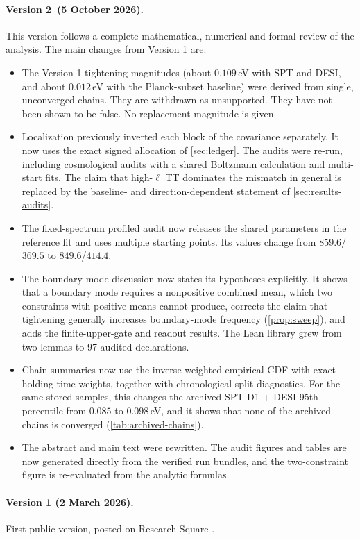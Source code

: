 \documentclass[11pt]{article}
\theoremstyle{remark}
\newcommand{\manuscriptversion}{Version 2}
\newcommand{\manuscriptdate}{5 October 2026}
\numberwithin{equation}{section}
\begin{document}
\paragraph{\manuscriptversion\ (\manuscriptdate).}
This version follows a complete mathematical, numerical and formal review of the analysis. The main changes from Version 1 are:
\begin{itemize}[leftmargin=*, itemsep=1pt]
  \item The Version 1 tightening magnitudes (about $0.109$\,eV with SPT and DESI, and about $0.012$\,eV with the Planck-subset baseline) were derived from single, unconverged chains. They are withdrawn as unsupported. They have not been shown to be false. No replacement magnitude is given.
  \item Localization previously inverted each block of the covariance separately. It now uses the exact signed allocation of \cref{sec:ledger}. The audits were re-run, including cosmological audits with a shared Boltzmann calculation and multi-start fits. The claim that high-$\ell$ TT dominates the mismatch in general is replaced by the baseline- and direction-dependent statement of \cref{sec:results-audits}.
  \item The fixed-spectrum profiled audit now releases the shared parameters in the reference fit and uses multiple starting points. Its values change from $859.6$/$369.5$ to $849.6$/$414.4$.
  \item The boundary-mode discussion now states its hypotheses explicitly. It shows that a boundary mode requires a nonpositive combined mean, which two constraints with positive means cannot produce, corrects the claim that tightening generally increases boundary-mode frequency (\cref{prop:sweep}), and adds the finite-upper-gate and readout results. The Lean library grew from two lemmas to 97 audited declarations.
  \item Chain summaries now use the inverse weighted empirical CDF with exact holding-time weights, together with chronological split diagnostics. For the same stored samples, this changes the archived SPT D1 + DESI 95th percentile from $0.085$ to $0.098$\,eV, and it shows that none of the archived chains is converged (\cref{tab:archived-chains}).
  \item The abstract and main text were rewritten. The audit figures and tables are now generated directly from the verified run bundles, and the two-constraint figure is re-evaluated from the analytic formulas.
\end{itemize}

\paragraph{Version 1 (2 March 2026).}
First public version, posted on Research Square \cite{tsiokos2026_neutrino_v1}.
 


\end{document}
